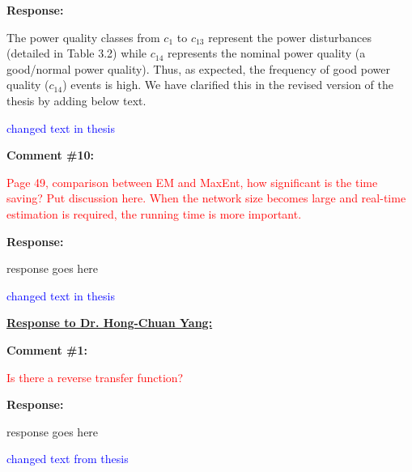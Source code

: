 \documentclass[journal]{IEEEtran}
\begin{document}
\vspace{10pt}
\textbf{Response:}
\begin{adjustwidth}{2.5em}{0pt}
The power quality classes from $c_1$ to $c_{13}$ represent the power disturbances (detailed in Table 3.2) while $c_{14}$ represents the nominal power quality (a good/normal power quality). Thus, as expected, the frequency of good power quality ($c_{14}$) events is high. We have clarified this in the revised version of the thesis by adding below text.

\vspace{10pt}
\noindent\textcolor{blue}{changed text in thesis}
\end{adjustwidth}

\vspace{30pt}
\textbf{Comment \#10:}
\begin{adjustwidth}{2.5em}{0pt}
\singlespacing \vspace{-10pt}
\textcolor{red}{Page 49, comparison between EM and MaxEnt, how significant is the time saving? Put discussion here. When the network size becomes large and real-time estimation is required, the running time is more important.}
\end{adjustwidth}

\vspace{10pt}
\textbf{Response:}
\begin{adjustwidth}{2.5em}{0pt}
response goes here

\vspace{10pt}
\noindent\textcolor{blue}{changed text in thesis}
\end{adjustwidth}






\vspace{50pt}
 \Large
\noindent \textbf{\underline{Response to Dr. Hong-Chuan Yang:}}
 \large
 
 \vspace{10pt}
\textbf{Comment \#1:}
\begin{adjustwidth}{2.5em}{0pt}
\singlespacing \vspace{-10pt}
\textcolor{red}{Is there a reverse transfer function?}
\end{adjustwidth}

\vspace{10pt}
\textbf{Response:}
\begin{adjustwidth}{2.5em}{0pt}
response goes here

\vspace{10pt}
\noindent\textcolor{blue}{changed text from thesis}
\end{adjustwidth}
\end{document}
